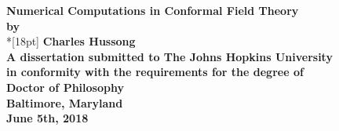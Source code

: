 \documentclass[12pt]{report}
\numberwithin{equation}{section}
\begin{document}
\newcommand{\bm}[1]{ \mbox{\boldmath $ #1 $} }
\newcommand{\bin}[2]{\left(\begin{array}{@{}c@{}} #1 \\ #2
             \end{array}\right) }
\renewcommand{\contentsname}{Table of Contents}
\baselineskip=24pt
 
\thispagestyle{empty}
\begin{center}
\vspace*{.25in}
{\bf\LARGE{ Numerical Computations in Conformal Field Theory }}\\
\vspace*{.75in}
{\bf by} \\*[18pt]
\vspace*{.2in}
{\bf Charles Hussong}\\
\vspace*{1in}
{\bf A dissertation submitted to The Johns Hopkins University\\
in conformity with the requirements for the degree of\\
Doctor of Philosophy }\\
\vspace*{.75in}
{\bf Baltimore, Maryland} \\
{\bf June 5th, 2018} \\     %
\end{center}
\newpage 

\pagestyle{plain}
\setcounter{page}{2}


% 

\pagestyle{plain}
\baselineskip=24pt
\tableofcontents
\listoffigures
\end{document}
